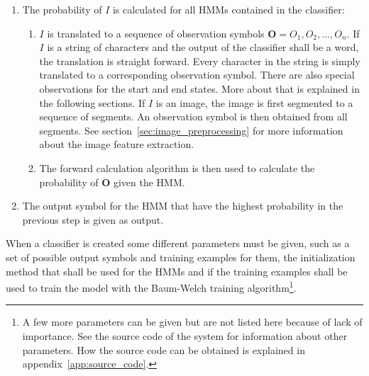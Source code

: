 \begin{enumerate}
  \item The probability of $I$ is calculated for all HMMs contained in the classifier:
    \begin{enumerate}
      \item $I$ is translated to a sequence of observation symbols $\mathbf{O} = O_{1},O_{2},...,O_{n}$. If $I$ is a string of characters and the output of the classifier shall be a word, the translation is straight forward. Every character in the string is simply translated to a corresponding observation symbol. There are also special observations for the start and end states. More about that is explained in the following sections. If $I$ is an image, the image is first segmented to a sequence of segments. An observation symbol is then obtained from all segments. See section~\ref{sec:image_preprocessing} for more information about the image feature extraction.
      \item The forward calculation algorithm \cite{Rabiner1989} is then used to calculate the probability of $\mathbf{O}$ given the HMM.
    \end{enumerate}
  \item The output symbol for the HMM that have the highest probability in the previous step is given as output.
\end{enumerate}
 
When a classifier is created some different parameters must be given, such as a set of possible output symbols and training examples for them, the initialization method that shall be used for the HMMs and if the training examples shall be used to train the model with the Baum-Welch \cite{Rabiner1989} training algorithm\footnote{A few more parameters can be given but are not listed here because of lack of importance. See the source code of the system for information about other parameters. How the source code can be obtained is explained in appendix~\ref{app:source_code}.}.